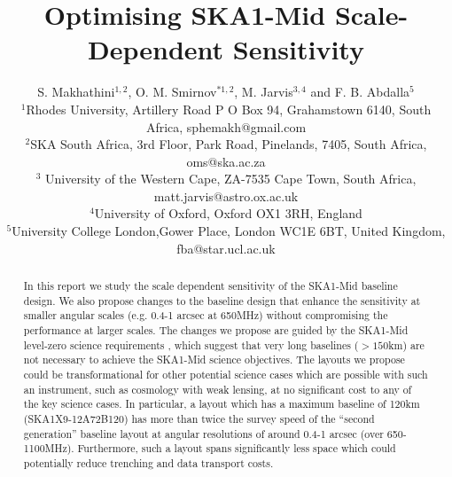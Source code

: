 \documentclass[sfheadings,a4paper,times,10pt,floats,floatfix]{article}
\title{Optimising SKA1-Mid Scale-Dependent Sensitivity}
\author{S. Makhathini$^{1,2}$, O. M. Smirnov$^{*1,2}$, M. Jarvis$^{3,4}$ and F. B. Abdalla$^5$ \\{\footnotesize  $^1$Rhodes
University, Artillery Road P O Box 94, Grahamstown 6140, South Africa, sphemakh@gmail.com} \\{ \footnotesize $^2$SKA South
Africa, 3rd Floor,
Park Road, Pinelands, 7405, South Africa, oms@ska.ac.za} \\{\footnotesize $^3$ University of the Western Cape, ZA-7535 Cape
Town, South
Africa, matt.jarvis@astro.ox.ac.uk}\\ {\footnotesize $^4$University of Oxford, Oxford OX1 3RH, England} \\ {\footnotesize
$^5$University College London,Gower Place, London WC1E 6BT, United Kingdom, fba@star.ucl.ac.uk}}
\date{}
\begin{document}
\maketitle

\begin{abstract}
In this report we study the scale dependent sensitivity of the SKA1-Mid baseline design. We also propose changes to the baseline
design that enhance the sensitivity at smaller angular scales (e.g. 0.4-1 arcsec at 650MHz) without compromising the performance
at
larger scales. The changes we propose are guided by the SKA1-Mid level-zero science requirements \cite{srd}, which suggest that
very long baselines ($>150$km) are not necessary to achieve the SKA1-Mid science objectives. The layouts we propose could be
transformational for other potential science cases which are possible with such an instrument, such as cosmology with weak
lensing, at no significant cost to any of the key science cases. In particular, a layout which has a maximum baseline of 120km
(SKA1X9-12A72B120) has more than twice the survey speed of the ``second generation'' baseline layout at angular resolutions of
around 0.4-1 arcsec (over 650-1100MHz). Furthermore, such a layout spans significantly less space which could potentially reduce
trenching and data transport costs.
\end{abstract}
\end{document}
